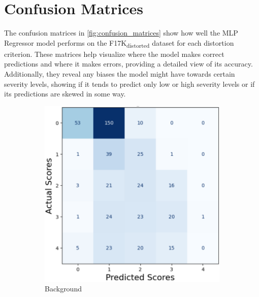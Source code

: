 \section{Confusion Matrices}
\label{sec:ConfusionMatrices}
The confusion matrices in \autoref{fig:confusion_matrices} show how well the MLP Regressor model performs on the F17K\textsubscript{distorted} dataset for each distortion criterion. These matrices help visualize where the model makes correct predictions and where it makes errors, providing a detailed view of its accuracy. Additionally, they reveal any biases the model might have towards certain severity levels, showing if it tends to predict only low or high severity levels or if its predictions are skewed in some way. \par
\vspace{\baselineskip}
\begin{figure}[ht]
    \centering
    \begin{subfigure}[b]{0.32\textwidth}
        \includegraphics[width=\textwidth]{img/cm/bg.png}
        \caption{Background}
        \label{fig:cm_bg}
    \end{subfigure}
    \hfill
    \begin{subfigure}[b]{0.32\textwidth}

\end{subfigure}
\end{figure}
